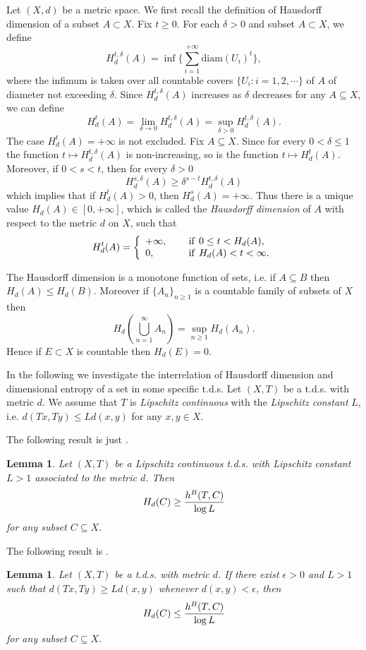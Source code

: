 \documentclass[12pt]{amsart}
\newtheorem{lem}[thm]{Lemma}
\theoremstyle{definition} \theoremstyle{question}
\numberwithin{equation}{section}
\begin{document}
Let $(X,d)$ be a metric space. We first recall the definition of
Hausdorff dimension of a subset $A\subset X$. Fix $t\ge 0$. For each
$\delta>0$ and subset  $A\subset X$, we define
$$H_d^{t,\delta}(A)=\inf \{ \sum_{i=1}^{+\infty} {\mbox{diam}(U_i)}^t\},$$
where the infimum is taken over all countable covers $\{
U_i:i=1,2,\cdots\}$ of $A$ of diameter not exceeding $\delta$. Since
$H_d^{t,\delta}(A)$ increases as $\delta$ decreases for any
$A\subseteq X$, we can define
$$H_d^t(A)=\lim_{\delta\rightarrow 0} H_d^{t,\delta}(A)
=\sup_{\delta>0} H_d^{t,\delta}(A).$$ The case $H_d^t(A)=+\infty$ is
not excluded. Fix $A\subseteq X$. Since for every $0<\delta\le 1$
the function $t\mapsto H_d^{t,\delta}(A)$ is non-increasing, so
is the function $t\mapsto H_d^{t}(A)$. Moreover, if $0<s<t$,
then for every $\delta>0$
$$H_d^{s,\delta}(A)\ge \delta^{s-t}H_d^{t,\delta}(A)$$
which implies that if $H_d^{t}(A)>0$, then $H_d^s(A)=+\infty$. Thus
there is a unique value $H_d(A)\in [0,+\infty]$, which is called the
{\it Hausdorff dimension} of $A$ with respect to the metric $d$ on
$X$, such that
$$H_d^t(A)=\left\{\begin{array}{ll}
 +\infty, &\quad \hbox{ if} \,\; 0\le t< H_d(A),\\
   0, &\quad \hbox{ if}\,\;
H_d(A)<t<\infty.\end{array}\right.
$$

The Hausdorff dimension is a monotone function of sets, i.e. if
$A\subseteq B$ then $H_d(A)\le H_d(B)$. Moreover if $\{ A_n\}_{n\ge
1}$ is a countable family of subsets of $X$ then
$$H_d(\bigcup\limits_{n=1}^\infty A_n)=\sup\limits_{n\ge 1}
H_d(A_n).$$ Hence if $E\subset X$ is countable then $H_d(E)=0$.

\medskip
In the following we investigate the interrelation of Hausdorff
dimension and dimensional entropy of a set in some specific t.d.s.
Let $(X,T)$ be a t.d.s. with metric $d$. We assume that $T$ is {\it
Lipschitz continuous} with the {\it Lipschitz constant} $L$, i.e.
$d(Tx,Ty)\le Ld(x,y)$ for any $x,y\in X$.

The following result is just \cite[Theorem 1]{Mi-add}.

\begin{lem} \label{nche1} Let $(X,T)$ be a Lipschitz continuous t.d.s. with Lipschitz constant $L>1$
associated to the metric $d$. Then
$$H_d(C)\geq {h^{B}(T, C) \over \log L} $$
for any subset  $C\subseteq X$.
\end{lem}

The following result is \cite[Lemma 5.4]{CHYZ}.
\begin{lem} \label{nche2} Let $(X,T)$ be a t.d.s. with metric $d$.
If there exist $\epsilon>0$ and $L>1$ such that $d(Tx,Ty)\geq
Ld(x,y)$ whenever $d(x,y)<\epsilon$, then
$$H_d(C)\le {h^{B}(T,C)\over\log L}$$ for any subset $C\subseteq
X$.
\end{lem}
\end{document}
